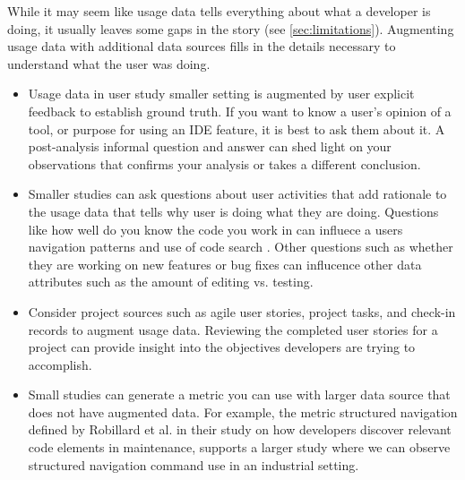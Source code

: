 While it may seem like usage data tells everything about what a developer is doing, it usually leaves some gaps in the story (see \ref{sec:limitations}).  Augmenting usage data with additional data sources fills in the details necessary to understand what the user was doing.  
    \begin{itemize}
\item
	Usage data in user study smaller setting is augmented by user explicit feedback to establish ground truth.  If you want to know a user's opinion of a tool, or purpose for using an IDE feature, it is best to ask them about it.  A post-analysis informal question and answer can shed light on your observations that confirms your analysis or takes a different conclusion.
\item
	Smaller studies can ask questions about user activities that add rationale to the usage data that tells why user is doing what they are doing.   Questions like how well do you know the code you work in can influece a users navigation patterns and use of code search \cite{wbsnipesthesis}.  Other questions such as whether they are working on new features or bug fixes can influcence other data attributes such as the amount of editing vs. testing.
\item
	Consider project sources such as agile user stories, project tasks, and check-in records to augment usage data.   Reviewing the completed user stories for a project can provide insight into the objectives developers are trying to accomplish.  
\item
	Small studies can generate a metric you can use with larger data source that does not have augmented data.  For example, the metric structured navigation defined by Robillard et al.  in their study on how developers discover relevant code elements in maintenance\cite{wbsnipes:Robillard2004How}, supports a larger study where we can observe structured navigation command use in an industrial setting.  
    \end{itemize}
    
